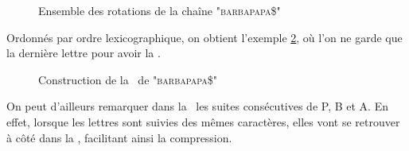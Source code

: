\begin{figure}[h!]
\caption{Ensemble des rotations de la chaîne "\textsc{barbapapa\$}"}
\label{rotations}
\end{figure}

Ordonnés par ordre lexicographique, on obtient l'exemple \ref{bwt}, où l'on ne garde que la dernière lettre pour avoir la \bwt.
\begin{figure}[h!]
\caption{Construction de la \bwt\ de "\textsc{barbapapa\$}"}
\label{bwt}
\end{figure}

On peut d'ailleurs remarquer dans la \bwt\ les suites consécutives de P, B et A. En effet, lorsque les lettres sont suivies des mêmes caractères, elles vont se retrouver à côté dans la \bwt, facilitant ainsi la compression.

